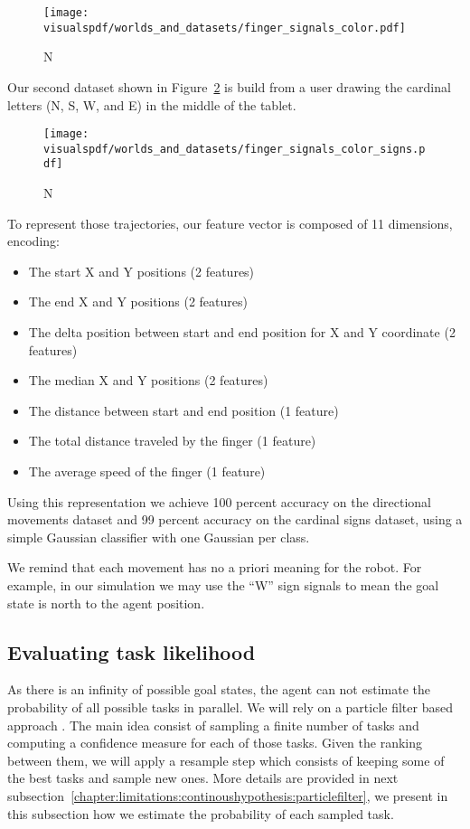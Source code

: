 \begin{figure}[!htbp]
\centering
\texttt{[image: \\visualspdf/worlds\_and\_datasets/finger\_signals\_color.pdf]}
\caption{N}
\label{fig:fingerdatasetdirection}
\end{figure} 

\newpage

Our second dataset shown in Figure~\ref{fig:fingerdatasetsigns} is build from a user drawing the cardinal letters (N, S, W, and E) in the middle of the tablet.

\begin{figure}[!htbp]
\centering
\texttt{[image: \\visualspdf/worlds\_and\_datasets/finger\_signals\_color\_signs.pdf]}
\caption{N}
\label{fig:fingerdatasetsigns}
\end{figure} 

To represent those trajectories, our feature vector is composed of 11 dimensions, encoding:
\begin{itemize}
   \item The start X and Y positions (2 features)
   \item The end X and Y positions (2 features)
   \item The delta position between start and end position for X and Y coordinate (2 features)
   \item The median X and Y positions (2 features)
   \item The distance between start and end position (1 feature)
   \item The total distance traveled by the finger (1 feature)
   \item The average speed of the finger (1 feature)
\end{itemize}

Using this representation we achieve 100 percent accuracy on the directional movements dataset and 99 percent accuracy on the cardinal signs dataset, using a simple Gaussian classifier with one Gaussian per class.

We remind that each movement has no a priori meaning for the robot. For example, in our simulation we may use the ``W'' sign signals to mean the goal state is north to the agent position.

\subsection{Evaluating task likelihood}

As there is an infinity of possible goal states, the agent can not estimate the probability of all possible tasks in parallel. We will rely on a particle filter based approach \cite{gordon1993novel,doucet2009tutorial,thrun2002particle}. The main idea consist of sampling a finite number of tasks and computing a confidence measure for each of those tasks. Given the ranking between them, we will apply a resample step which consists of keeping some of the best tasks and sample new ones. More details are provided in next subsection~\ref{chapter:limitations:continoushypothesis:particlefilter}, we present in this subsection how we estimate the probability of each sampled task.

